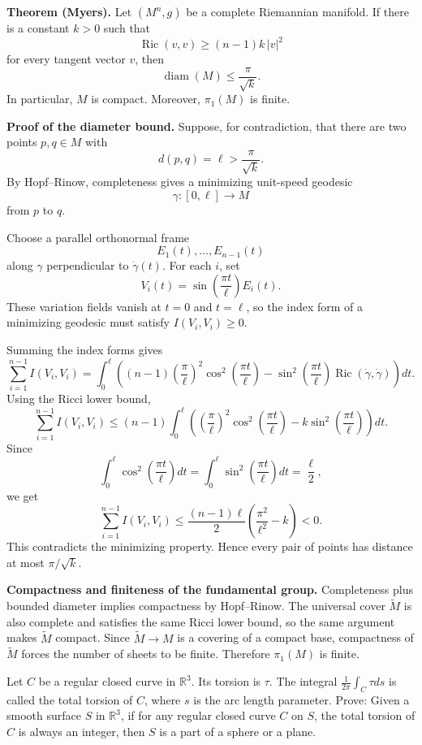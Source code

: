 \begin{solution}
\textbf{Theorem (Myers).}
Let $(M^n,g)$ be a complete Riemannian manifold. If there is a constant $k>0$ such that
\[
\operatorname{Ric}(v,v)\geq (n-1)k\,|v|^2
\]
for every tangent vector $v$, then
\[
\operatorname{diam}(M)\leq \frac{\pi}{\sqrt{k}}.
\]
In particular, $M$ is compact. Moreover, $\pi_1(M)$ is finite.

\textbf{Proof of the diameter bound.}
Suppose, for contradiction, that there are two points $p,q\in M$ with
\[
d(p,q)=\ell>\frac{\pi}{\sqrt{k}}.
\]
By Hopf--Rinow, completeness gives a minimizing unit-speed geodesic
\[
\gamma:[0,\ell]\to M
\]
from $p$ to $q$.

Choose a parallel orthonormal frame
\[
E_1(t),\dots,E_{n-1}(t)
\]
along $\gamma$ perpendicular to $\dot\gamma(t)$. For each $i$, set
\[
V_i(t)=\sin\left(\frac{\pi t}{\ell}\right)E_i(t).
\]
These variation fields vanish at $t=0$ and $t=\ell$, so the index form of a minimizing geodesic must satisfy $I(V_i,V_i)\geq 0$.

Summing the index forms gives
\[
\sum_{i=1}^{n-1} I(V_i,V_i)
=\int_0^\ell
\left((n-1)\left(\frac{\pi}{\ell}\right)^2\cos^2\left(\frac{\pi t}{\ell}\right)
-\sin^2\left(\frac{\pi t}{\ell}\right)\operatorname{Ric}(\dot\gamma,\dot\gamma)
\right)dt.
\]
Using the Ricci lower bound,
\[
\sum_{i=1}^{n-1} I(V_i,V_i)
\leq (n-1)\int_0^\ell
\left(
\left(\frac{\pi}{\ell}\right)^2\cos^2\left(\frac{\pi t}{\ell}\right)
-k\sin^2\left(\frac{\pi t}{\ell}\right)
\right)dt.
\]
Since
\[
\int_0^\ell \cos^2\left(\frac{\pi t}{\ell}\right)dt
=
\int_0^\ell \sin^2\left(\frac{\pi t}{\ell}\right)dt
=\frac{\ell}{2},
\]
we get
\[
\sum_{i=1}^{n-1} I(V_i,V_i)
\leq
\frac{(n-1)\ell}{2}\left(\frac{\pi^2}{\ell^2}-k\right)<0.
\]
This contradicts the minimizing property. Hence every pair of points has distance at most $\pi/\sqrt{k}$.

\textbf{Compactness and finiteness of the fundamental group.}
Completeness plus bounded diameter implies compactness by Hopf--Rinow. The universal cover $\widetilde M$ is also complete and satisfies the same Ricci lower bound, so the same argument makes $\widetilde M$ compact. Since $\widetilde M\to M$ is a covering of a compact base, compactness of $\widetilde M$ forces the number of sheets to be finite. Therefore $\pi_1(M)$ is finite.
\end{solution}

\begin{exercise}
\label{geometry:2013:12}
Let $C$ be a regular closed curve in $\mathbb{R}^3$. Its torsion is $\tau$. The integral $\frac{1}{2\pi} \int_C \tau ds$ is called the total torsion of $C$, where $s$ is the arc length parameter. Prove: Given a smooth surface $S$ in $\mathbb{R}^3$, if for any regular closed curve $C$ on $S$, the total torsion of $C$ is always an integer, then $S$ is a part of a sphere or a plane.
\end{exercise}

